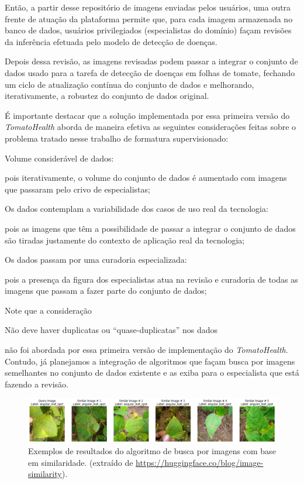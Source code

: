 Então, a partir desse repositório de imagens enviadas pelos usuários, uma outra frente de atuação da plataforma permite que, para cada imagem armazenada no banco de dados, usuários privilegiados (especialistas do domínio) façam revisões da inferência efetuada pelo modelo de detecção de doenças. 

Depois dessa revisão, as imagens revisadas podem passar a integrar o conjunto de dados usado para a tarefa de detecção de doenças em folhas de tomate, fechando um ciclo de atualização contínua do conjunto de dados e melhorando, iterativamente, a robustez do conjunto de dados original.

É importante destacar que a solução implementada por essa primeira versão do \emph{TomatoHealth} aborda de maneira efetiva as seguintes considerações feitas sobre o problema tratado nesse trabalho de formatura supervisionado:

\begin{enumerate}
{\bf \item  Volume considerável de dados:} pois iterativamente, o volume do conjunto de dados é aumentado com imagens que passaram pelo crivo de especialistas;

{\bf \item Os dados contemplam a variabilidade dos casos de uso real da tecnologia:} pois as imagens que têm a possibilidade de passar a integrar o conjunto de dados são tiradas justamente do contexto de aplicação real da tecnologia;

{\bf \item Os dados passam por uma curadoria especializada:} pois a presença da figura dos especialistas atua na revisão e curadoria de todas as imagens que passam a fazer parte do conjunto de dados;

\end{enumerate}

Note que a consideração 

\begin{enumerate}
    \setcounter{enumi}{3}
    {\bf \item Não deve haver duplicatas ou ``quase-duplicatas'' nos dados}
\end{enumerate}

não foi abordada por essa primeira versão de implementação do \emph{TomatoHealth}. Contudo, já planejamos a integração de algoritmos que façam busca por imagens semelhantes no conjunto de dados existente e as exiba para o especialista que está fazendo a revisão.

\begin{figure}
    \centering
    \includegraphics[width=1\linewidth]{images/results_one.png}
    \caption{\label{fig:similaridade}Exemplos de resultados do algoritmo de busca por imagens com base em similaridade. (extraído de \url{https://huggingface.co/blog/image-similarity}).}
\end{figure}

